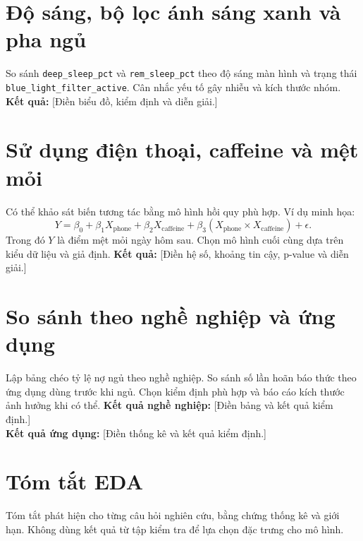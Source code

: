 \section{Độ sáng, bộ lọc ánh sáng xanh và pha ngủ}
So sánh \texttt{deep\_sleep\_pct} và \texttt{rem\_sleep\_pct} theo độ sáng màn hình và trạng thái \texttt{blue\_light\_filter\_active}. Cân nhắc yếu tố gây nhiễu và kích thước nhóm.
\noindent\textbf{Kết quả:} [Điền biểu đồ, kiểm định và diễn giải.]
\section{Sử dụng điện thoại, caffeine và mệt mỏi}
Có thể khảo sát biến tương tác bằng mô hình hồi quy phù hợp. Ví dụ minh họa:
\[
Y=\beta_0+\beta_1X_{\text{phone}}+\beta_2X_{\text{caffeine}}+
\beta_3(X_{\text{phone}}\times X_{\text{caffeine}})+\epsilon.
\]
Trong đó \(Y\) là điểm mệt mỏi ngày hôm sau. Chọn mô hình cuối cùng dựa trên kiểu dữ liệu và giả định.
\noindent\textbf{Kết quả:} [Điền hệ số, khoảng tin cậy, p-value và diễn giải.]
\section{So sánh theo nghề nghiệp và ứng dụng}
Lập bảng chéo tỷ lệ nợ ngủ theo nghề nghiệp. So sánh số lần hoãn báo thức theo ứng dụng dùng trước khi ngủ. Chọn kiểm định phù hợp và báo cáo kích thước ảnh hưởng khi có thể.
\noindent\textbf{Kết quả nghề nghiệp:} [Điền bảng và kết quả kiểm định.]
\\
\noindent\textbf{Kết quả ứng dụng:} [Điền thống kê và kết quả kiểm định.]
\section{Tóm tắt EDA}
Tóm tắt phát hiện cho từng câu hỏi nghiên cứu, bằng chứng thống kê và giới hạn. Không dùng kết quả từ tập kiểm tra để lựa chọn đặc trưng cho mô hình.
